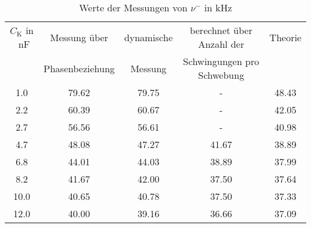 \begin{table}[h!]
\begin{center}
\begin{tabular}{c | c | c | c | c}
	$C_\text{K}$ in \SI{}{\nano\farad} & Messung über & dynamische & berechnet über Anzahl der & Theorie \\
	& Phasenbeziehung & Messung & Schwingungen pro Schwebung & \\
\hline
	1.0 & 79.62 & 79.75 & - & 48.43 \\
	2.2 & 60.39 & 60.67 & - & 42.05 \\
	2.7 & 56.56 & 56.61 & - & 40.98 \\
	4.7 & 48.08 & 47.27 & 41.67 & 38.89 \\
	6.8 & 44.01 & 44.03 & 38.89 & 37.99 \\
	8.2 & 41.67 & 42.00 & 37.50 & 37.64 \\
	10.0 & 40.65 & 40.78 & 37.50 & 37.33 \\
	12.0 & 40.00 & 39.16 & 36.66 & 37.09 \\
\end{tabular}
\end{center}
\caption{Werte der Messungen von $\nu^-$ in \si{\kilo\hertz}}
\label{fig:FreqMinus}
\end{table}
